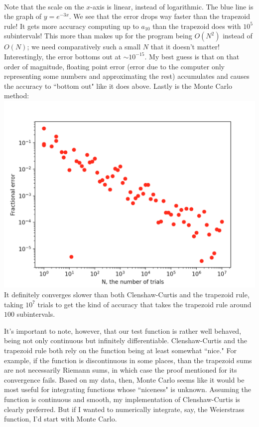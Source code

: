 \documentclass[11pt]{article}
\theoremstyle{plain}
\begin{document}
\\ Note that the scale on the $x$-axis is linear, instead of logarithmic. The blue line is the graph of $y = e^{-3x}$. We see that the error drops way faster than the trapezoid rule! It gets more accuracy computing up to $a_{10}$ than the trapezoid does with $10^5$ subintervals! This more than makes up for the program being $O(N^2)$ instead of $O(N)$; we need comparatively such a small $N$ that it doesn't matter! Interestingly, the error bottoms out at $\sim10^{-15}$. My best guess is that on that order of magnitude, floating point error (error due to the computer only representing some numbers and approximating the rest) accumulates and causes the accuracy to ``bottom out" like it does above. Lastly is the Monte Carlo method: \\
\includegraphics[scale=0.5]{montecarlo}
\\ It definitely converges slower than both Clenshaw-Curtis and the trapezoid rule, taking $10^7$ trials to get the kind of accuracy that takes the trapezoid rule around $100$ subintervals. 
\par 
It's important to note, however, that our test function is rather well behaved, being not only continuous but infinitely differentiable. Clenshaw-Curtis and the trapezoid rule both rely on the function being at least somewhat ``nice." For example, if the function is discontinuous in some places, than the trapezoid sums are not necessarily Riemann sums, in which case the proof mentioned for its convergence fails. Based on my data, then, Monte Carlo seems like it would be most useful for integrating functions whose ``niceness" is unknown. Assuming the function is continuous and smooth, my implementation of Clenshaw-Curtis is clearly preferred. But if I wanted to numerically integrate, say, the Weierstrass function, I'd start with Monte Carlo.
\end{document}
